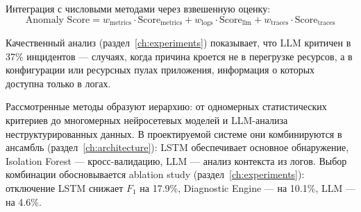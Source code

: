 Интеграция с числовыми методами через взвешенную оценку:
\begin{equation}
\text{Anomaly Score} = w_{\text{metrics}} \cdot \text{Score}_{\text{metrics}} + w_{\text{logs}} \cdot \text{Score}_{\text{llm}} + w_{\text{traces}} \cdot \text{Score}_{\text{traces}}
\label{eq:llm_integration}
\end{equation}

Качественный анализ (раздел~\ref{ch:experiments}) показывает, что LLM критичен в 37\% инцидентов --- случаях, когда причина кроется не в перегрузке ресурсов, а в конфигурации или ресурсных пулах приложения, информация о которых доступна только в логах.

\medskip

Рассмотренные методы образуют иерархию: от одномерных статистических критериев до многомерных нейросетевых моделей и LLM-анализа неструктурированных данных. В проектируемой системе они комбинируются в ансамбль (раздел~\ref{ch:architecture}): LSTM обеспечивает основное обнаружение, Isolation Forest --- кросс-валидацию, LLM --- анализ контекста из логов. Выбор комбинации обосновывается ablation study (раздел~\ref{ch:experiments}): отключение LSTM снижает $F_1$ на 17.9\%, Diagnostic Engine --- на 10.1\%, LLM --- на 4.6\%.
